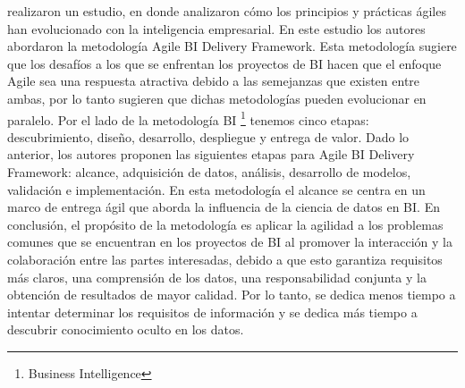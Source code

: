 \citep{Larson2016} realizaron un estudio, en donde analizaron cómo los principios y prácticas ágiles han evolucionado con la inteligencia empresarial. En este estudio los autores abordaron la metodología Agile BI Delivery Framework. Esta metodología sugiere que los desafíos a los que se enfrentan los proyectos de BI hacen que el enfoque Agile sea una respuesta atractiva debido a las semejanzas que existen entre ambas, por lo tanto sugieren que dichas metodologías pueden evolucionar en paralelo. Por el lado de la metodología BI \footnote{Business Intelligence} tenemos cinco etapas: descubrimiento, diseño, desarrollo, despliegue y entrega de valor. Dado lo anterior, los autores proponen las siguientes etapas para Agile BI Delivery Framework: alcance, adquisición de datos, análisis, desarrollo de modelos, validación e implementación. En esta metodología el alcance se centra en un marco de entrega ágil que aborda la influencia de la ciencia de datos en BI. En conclusión, el propósito de la metodología es aplicar la agilidad a los problemas comunes que se encuentran en los proyectos de BI al promover la interacción y la colaboración entre las partes interesadas, debido a que esto garantiza requisitos más claros, una comprensión de los datos, una responsabilidad conjunta y la obtención de resultados de mayor calidad. Por lo tanto, se dedica menos tiempo a intentar determinar los requisitos de información y se dedica más tiempo a descubrir conocimiento oculto en los datos.

